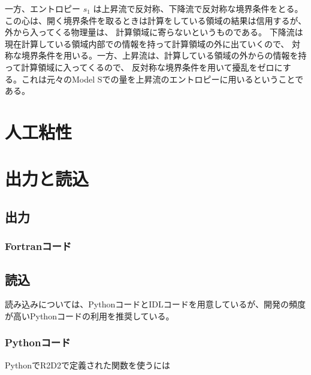 \documentclass[letterpaper,10pt,dvipdfmx,report]{sphinxmanual}
\begin{document}
一方、エントロピー \(s_1\) は上昇流で反対称、下降流で反対称な境界条件をとる。
この心は、開く境界条件を取るときは計算をしている領域の結果は信用するが、外から入ってくる物理量は、
計算領域に寄らないというものである。 下降流は現在計算している領域内部での情報を持って計算領域の外に出ていくので、
対称な境界条件を用いる。一方、上昇流は、計算している領域の外からの情報を持って計算領域に入ってくるので、
反対称な境界条件を用いて擾乱をゼロにする。これは元々のModel Sでの量を上昇流のエントロピーに用いるということである。


\chapter{人工粘性}
\label{\detokenize{artdif:id1}}\label{\detokenize{artdif::doc}}

\chapter{出力と読込}
\label{\detokenize{io:id1}}\label{\detokenize{io::doc}}

\section{出力}
\label{\detokenize{io:id2}}

\subsection{Fortranコード}
\label{\detokenize{io:fortran}}

\section{読込}
\label{\detokenize{io:id3}}
読み込みについては、PythonコードとIDLコードを用意しているが、開発の頻度が高いPythonコードの利用を推奨している。


\subsection{Pythonコード}
\label{\detokenize{io:module-R2D2}}\label{\detokenize{io:python}}
PythonでR2D2で定義された関数を使うには

\begin{sphinxVerbatim}[commandchars=\\\{\}]
 
\end{sphinxVerbatim}
\end{document}
